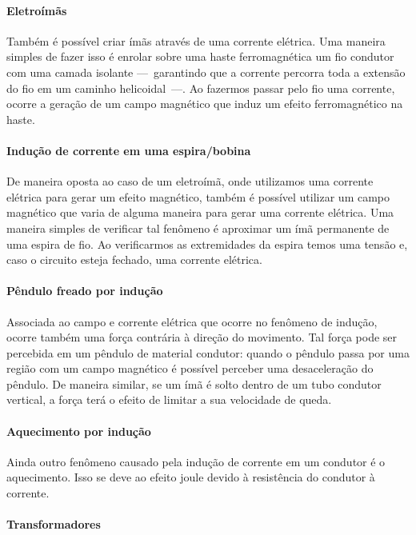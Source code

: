 \paragraph{Eletroímãs}

Também é possível criar ímãs através de uma corrente elétrica. Uma maneira simples de fazer isso é  enrolar sobre uma haste ferromagnética um fio condutor com uma camada isolante ---~garantindo que a corrente percorra toda a extensão do fio em um caminho helicoidal~---. Ao fazermos passar pelo fio uma corrente, ocorre a geração de um campo magnético que induz um efeito ferromagnético na haste.

\paragraph{Indução de corrente em uma espira/bobina}

De maneira oposta ao caso de um eletroímã, onde utilizamos uma corrente elétrica para gerar um efeito magnético, também é possível utilizar um campo magnético que varia de alguma maneira para gerar uma corrente elétrica. Uma maneira simples de verificar tal fenômeno é aproximar um ímã permanente de uma espira de fio. Ao verificarmos as extremidades da espira temos uma tensão e, caso o circuito esteja fechado, uma corrente elétrica.

\paragraph{Pêndulo freado por indução}

Associada ao campo e corrente elétrica que ocorre no fenômeno de indução, ocorre também uma força contrária à direção do movimento. Tal força pode ser percebida em um pêndulo de material condutor: quando o pêndulo passa por uma região com um campo magnético é possível perceber uma desaceleração do pêndulo. De maneira similar, se um ímã é solto dentro de um tubo condutor vertical, a força terá o efeito de limitar a sua velocidade de queda.

\paragraph{Aquecimento por indução}

Ainda outro fenômeno causado pela indução de corrente em um condutor é o aquecimento. Isso se deve ao efeito joule devido à resistência do condutor à corrente.

\paragraph{Transformadores}

